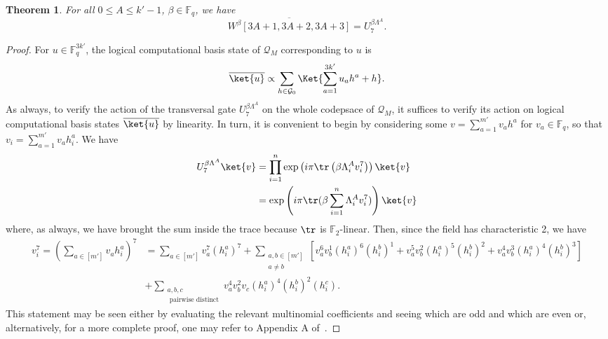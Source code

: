 \documentclass[11pt]{article}
\newtheorem{theorem}{Theorem}[section]
\theoremstyle{definition}
\renewcommand{\le}{\leqslant}
\newcommand{\cG}{\mathcal{G}}
\newcommand{\qcode}{\mathcal{Q}}
\newcommand{\FF}{\mathbb{F}}
\newcommand*{\ol}{\overline}
\begin{document}
\begin{theorem}
For all $0\le A\le k'-1$, $\beta\in \FF_q$,  we have
\begin{equation}
    \ol{W^\beta [3A+1, 3A+2, 3A+3]} = U_7^{\beta \Lambda^A}.
\end{equation}
\end{theorem}
\begin{proof}
For $u\in \FF_q^{3k'}$, the logical computational basis state of $\qcode_M$ corresponding to $u$ is
\begin{equation}
    \ol{\ket{u}} \propto \sum_{h\in \cG_0} \Ket{\sum_{a=1}^{3k'} u_{a}h^{a} + h}. 
\end{equation}
As always, to verify the action of the transversal gate $U_7^{\beta\Lambda^A}$ on the whole codepsace of $\qcode_M$, it suffices to verify its action on logical computational basis states $\ol{\ket{u}}$ by linearity. In turn, it is convenient to begin by considering some $v = \sum_{a=1}^{m'}v_ah^a$ for $v_a \in \mathbb{F}_q$, so that $v_i = \sum_{a=1}^{m'}v_ah^a_i$. We have
\begin{align}
    U_7^{\beta\Lambda^A}\ket{v} &= \prod_{i=1}^n\exp\left(i\pi\tr\left(\beta\Lambda_i^Av_i^7\right)\right)\ket{v}\\
    &=\exp\left(i\pi\tr(\beta\sum_{i=1}^n\Lambda_i^Av_i^7)\right)\ket{v}\label{eq:designed_intrablock_pre_calc}
\end{align}
where, as always, we have brought the sum inside the trace because $\tr$ is $\mathbb{F}_2$-linear. Then, since the field has characteristic 2, we have
\begin{align}\label{eq:seven_multinomial_one}
    v_i^7 = \left(\sum_{a \in [m']} v_{a}h^{a}_i \right)^7 &= \sum_{a\in [m']} v_a^7(h^a_i)^7 + \sum_{\substack{a,b \in [m']\\a \neq b}}[v_a^6v_b^1(h^a_i)^6(h^b_i)^1 + v_a^5v_b^2(h^a_i)^5(h^b_i)^2 + 
    v_a^4v_b^3(h^a_i)^4(h^b_i)^3] \\
    &+ \sum_{\substack{a,b,c \\\text{ pairwise distinct}}}v_a^4v_b^2v_c(h^a_i)^4(h^b_i)^2(h^c_i).\label{eq:seven_multinomial_two}
\end{align}
This statement may be seen either by evaluating the relevant multinomial coefficients and seeing which are odd and which are even or, alternatively, for a more complete proof, one may refer to Appendix A of~\cite{wills2024constant}.


\end{proof}
\end{document}
